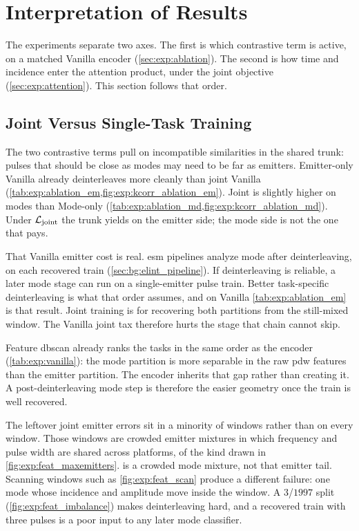 \section{Interpretation of Results}\label{sec:disc:interp}

The experiments separate two axes.
The first is which contrastive term is active, on a matched Vanilla encoder (\cref{sec:exp:ablation}).
The second is how time and incidence enter the attention product, under the joint objective (\cref{sec:exp:attention}).
This section follows that order.

\subsection{Joint Versus Single-Task Training}\label{sec:disc:joint}

The two contrastive terms pull on incompatible similarities in the shared trunk: pulses that should be close as modes may need to be far as emitters.
Emitter-only Vanilla already deinterleaves more cleanly than joint Vanilla (\cref{tab:exp:ablation_em,fig:exp:kcorr_ablation_em}).
Joint is slightly higher on modes than Mode-only (\cref{tab:exp:ablation_md,fig:exp:kcorr_ablation_md}).
Under $\mathcal{L}_{\mathrm{joint}}$ the trunk yields on the emitter side; the mode side is not the one that pays.

That Vanilla emitter cost is real.
\Gls{esm} pipelines analyze mode after deinterleaving, on each recovered train (\cref{sec:bg:elint_pipeline}).
If deinterleaving is reliable, a later mode stage can run on a single-emitter pulse train.
Better task-specific deinterleaving is what that order assumes, and on Vanilla \cref{tab:exp:ablation_em} is that result.
Joint training is for recovering both partitions from the still-mixed window.
The Vanilla joint tax therefore hurts the stage that chain cannot skip.

Feature \gls{dbscan} already ranks the tasks in the same order as the encoder (\cref{tab:exp:vanilla}): the mode partition is more separable in the raw \gls{pdw} features than the emitter partition.
The encoder inherits that gap rather than creating it.
A post-deinterleaving mode step is therefore the easier geometry once the train is well recovered.

The leftover joint emitter errors sit in a minority of windows rather than on every window.
Those windows are crowded emitter mixtures in which frequency and pulse width are shared across platforms, of the kind drawn in \cref{fig:exp:feat_maxemitters}.
 is a crowded mode mixture, not that emitter tail.
Scanning windows such as \cref{fig:exp:feat_scan} produce a different failure: one mode whose incidence and amplitude move inside the window.
A $3$/$1997$ split (\cref{fig:exp:feat_imbalance}) makes deinterleaving hard, and a recovered train with three pulses is a poor input to any later mode classifier.

